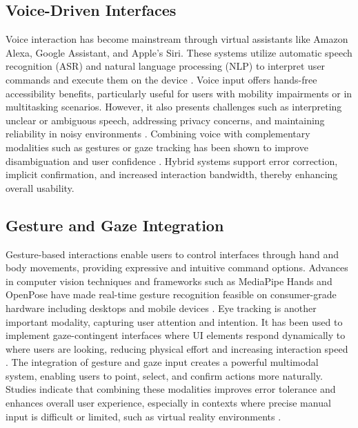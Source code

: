 \documentclass[openany]{book}
\begin{document}
\subsection{Voice-Driven Interfaces}

Voice interaction has become mainstream through virtual assistants like Amazon Alexa, Google Assistant, and Apple’s Siri. These systems utilize automatic speech recognition (ASR) and natural language processing (NLP) to interpret user commands and execute them on the device \cite{Hoy02012018}. Voice input offers hands-free accessibility benefits, particularly useful for users with mobility impairments or in multitasking scenarios. However, it also presents challenges such as interpreting unclear or ambiguous speech, addressing privacy concerns, and maintaining reliability in noisy environments \cite{HCI-076}. Combining voice with complementary modalities such as gestures or gaze tracking has been shown to improve disambiguation and user confidence \cite{s21237825}. Hybrid systems support error correction, implicit confirmation, and increased interaction bandwidth, thereby enhancing overall usability.

\subsection{Gesture and Gaze Integration}

Gesture-based interactions enable users to control interfaces through hand and body movements, providing expressive and intuitive command options. Advances in computer vision techniques and frameworks such as MediaPipe Hands and OpenPose have made real-time gesture recognition feasible on consumer-grade hardware including desktops and mobile devices \cite{lugaresi2019mediapipeframeworkbuildingperception}.  
Eye tracking is another important modality, capturing user attention and intention. It has been used to implement gaze-contingent interfaces where UI elements respond dynamically to where users are looking, reducing physical effort and increasing interaction speed \cite{Duchowski2017}.  
The integration of gesture and gaze input creates a powerful multimodal system, enabling users to point, select, and confirm actions more naturally. Studies indicate that combining these modalities improves error tolerance and enhances overall user experience, especially in contexts where precise manual input is difficult or limited, such as virtual reality environments \cite{7893331, Gazeinteractioninthepost-WIMPworld}.
\end{document}
